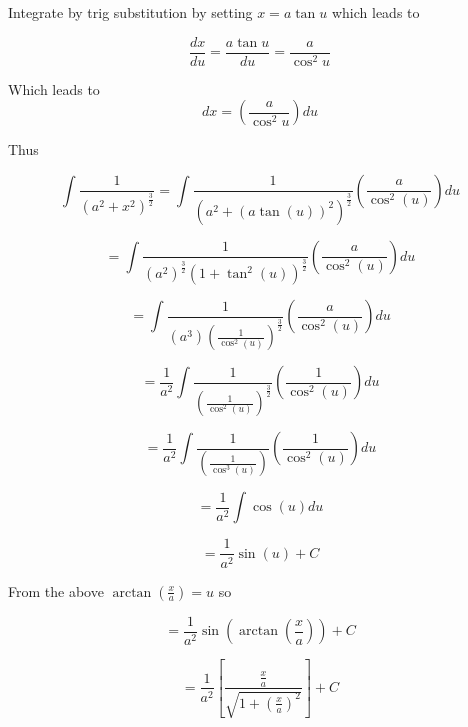 \documentclass[14pt]{memoir}
\begin{document}
Integrate by trig substitution by setting $x = a\tan{u}$ which leads to 

\begin{equation}
\frac{dx}{du} = \frac{a \tan{u}}{du} = \frac{a}{\cos^2{u}}
\end{equation}

Which leads to 
\begin{equation}
dx = ( \frac{a}{\cos^2{u}}) du 
\end{equation}

Thus

\begin{equation}
\int \frac{1}{(a^2 + x^2)^{\frac{3}{2}}} =  \int \frac{1}{(a^2 + (a\tan{(u)})^2)^{\frac{3}{2}}} ( \frac{a}{\cos^2{(u)}}) du
\end{equation}

\begin{equation}
=  \int \frac{1}{(a^2)^{\frac{3}{2}} (1 + \tan^2{(u)})^{\frac{3}{2}}} ( \frac{a}{\cos^2{(u)}}) du
\end{equation}

\begin{equation}
=  \int \frac{1}{(a^3)(\frac{1}{\cos^2(u)})^{\frac{3}{2}}} ( \frac{a}{\cos^2{(u)}}) du
\end{equation}

\begin{equation}
=  \frac{1}{a^2} \int \frac{1}{(\frac{1}{\cos^2(u)})^{\frac{3}{2}}} ( \frac{1}{\cos^2{(u)}}) du
\end{equation}

\begin{equation}
=  \frac{1}{a^2} \int \frac{1}{(\frac{1}{\cos^3(u)})} ( \frac{1}{\cos^2{(u)}}) du
\end{equation}

\begin{equation}
=  \frac{1}{a^2} \int \cos{(u)} du
\end{equation}

\begin{equation}
=  \frac{1}{a^2} \sin{(u)} + C
\end{equation}


From the above $\arctan{(\frac{x}{a})} = u$ so

\begin{equation}
=  \frac{1}{a^2} \sin{(\arctan{(\frac{x}{a})})} + C
\end{equation}

\begin{equation}
=  \frac{1}{a^2} [\frac{\frac{x}{a}}{\sqrt{1+(\frac{x}{a})^2}}] + C
\end{equation}
\end{document}
